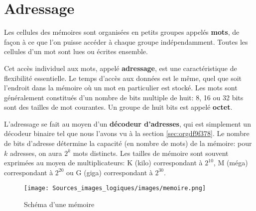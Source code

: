 \documentclass[letter, oneside]{book}
\begin{document}
\section{Adressage}
\label{sec:orge8bb466}

Les cellules des mémoires sont organisées en petits groupes appelés
\textbf{mots}, de façon à ce que l'on puisse accéder à chaque groupe
indépendamment. Toutes les cellules d'un mot sont lues ou écrites
ensemble.

Cet accès individuel aux mots, appelé \textbf{adressage}, est une
caractéristique de flexibilité essentielle. Le temps d'accès aux
données est le même, quel que soit l'endroit dans la mémoire où un mot
en particulier est stocké. Les mots sont généralement constitués d'un
nombre de bits multiple de huit: 8, 16 ou 32 bits sont des tailles de
mot courantes. Un groupe de huit bits est appelé \textbf{octet}.

L'adressage se fait au moyen d'un \textbf{décodeur d'adresses}, qui est
simplement un décodeur binaire tel que nous l'avons vu à la section
\ref{sec:orgdf9f378}. Le nombre de bits d'adresse détermine la capacité (en nombre
de mots) de la mémoire: pour \(k\) adresses, on aura \(2^k\) mots
distincts. Les tailles de mémoire sont souvent exprimées au moyen de
multiplicateurs: K (kilo) correspondant à \(2^{10}\), M (méga)
correspondant à \(2^{20}\) ou G (giga) correspondant à \(2^{30}\).


\begin{figure}[htbp]
\centering
\texttt{[image: Sources\_images\_logiques/images/memoire.png]}
\caption{\label{fig:orgcdbe711}Schéma d'une mémoire}
\end{figure}
\end{document}
